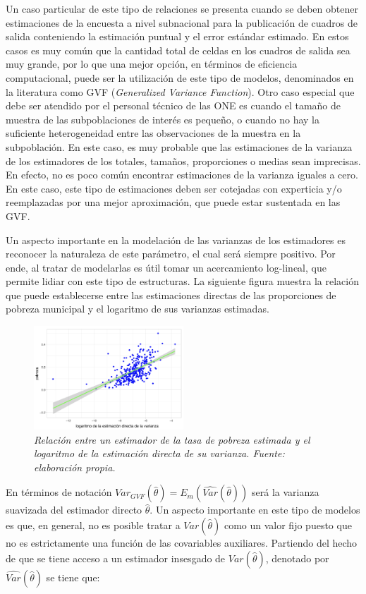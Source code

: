 \documentclass[
  12pt,
]{book}
\begin{document}
Un caso particular de este tipo de relaciones se presenta cuando se deben obtener estimaciones de la encuesta a nivel subnacional para la publicación de cuadros de salida conteniendo la estimación puntual y el error estándar estimado. En estos casos es muy común que la cantidad total de celdas en los cuadros de salida sea muy grande, por lo que una mejor opción, en términos de eficiencia computacional, puede ser la utilización de este tipo de modelos, denominados en la literatura como GVF (\emph{Generalized Variance Function}). Otro caso especial que debe ser atendido por el personal técnico de las ONE es cuando el tamaño de muestra de las subpoblaciones de interés es pequeño, o cuando no hay la suficiente heterogeneidad entre las observaciones de la muestra en la subpoblación. En este caso, es muy probable que las estimaciones de la varianza de los estimadores de los totales, tamaños, proporciones o medias sean imprecisas. En efecto, no es poco común encontrar estimaciones de la varianza iguales a cero. En este caso, este tipo de estimaciones deben ser cotejadas con experticia y/o reemplazadas por una mejor aproximación, que puede estar sustentada en las GVF.

Un aspecto importante en la modelación de las varianzas de los estimadores es reconocer la naturaleza de este parámetro, el cual será siempre positivo. Por ende, al tratar de modelarlas es útil tomar un acercamiento log-lineal, que permite lidiar con este tipo de estructuras. La siguiente figura muestra la relación que puede establecerse entre las estimaciones directas de las proporciones de pobreza municipal y el logaritmo de sus varianzas estimadas.

\begin{figure}
\centering
\includegraphics[width=0.5\textwidth,height=\textheight]{Pics/GVFmds.png}
\caption{\emph{Relación entre un estimador de la tasa de pobreza estimada y el logaritmo de la estimación directa de su varianza. Fuente: elaboración propia.}}
\end{figure}

En términos de notación \(Var_{GVF}(\hat{\theta}) = E_m(\widehat{Var}(\hat{\theta}))\) será la varianza suavizada del estimador directo \(\hat{\theta}\). Un aspecto importante en este tipo de modelos es que, en general, no es posible tratar a \(Var(\hat{\theta})\) como un valor fijo puesto que no es estrictamente una función de las covariables auxiliares. Partiendo del hecho de que se tiene acceso a un estimador insesgado de \({Var}(\hat{\theta})\), denotado por \(\widehat{Var}(\hat{\theta})\) se tiene que:
\end{document}
